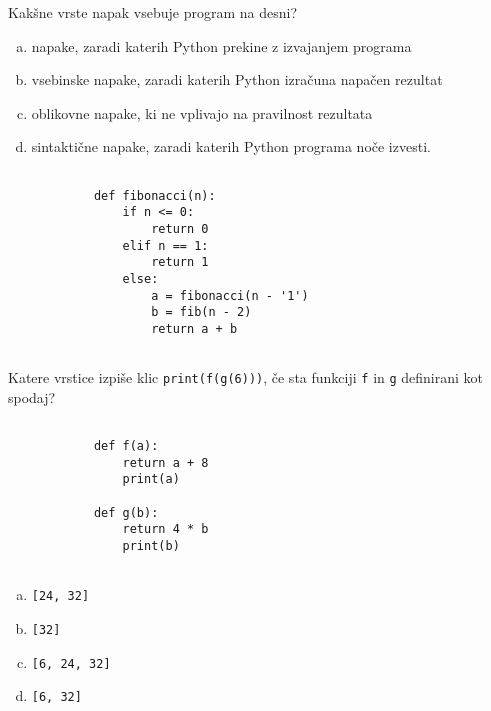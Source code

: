 \documentclass[arhiv, 10pt]{../izpit}
\newcommand{\inlinepy}[1]{\texttt{#1}}
\begin{document}
        \naloga*
        \begin{multicols}{2}
        \noindent
        Kakšne vrste napak vsebuje program na desni?

        \begin{enumerate}[(a)]
\item napake, zaradi katerih Python prekine z izvajanjem programa
\item vsebinske napake, zaradi katerih Python izračuna napačen rezultat
\item oblikovne napake, ki ne vplivajo na pravilnost rezultata
\item sintaktične napake, zaradi katerih Python programa noče izvesti.
\end{enumerate}

        \columnbreak

        \begin{verbatim}
        
            def fibonacci(n):
                if n <= 0:
                    return 0
                elif n == 1:
                    return 1
                else:
                    a = fibonacci(n - '1')
                    b = fib(n - 2)
                    return a + b
            
        \end{verbatim}

        \end{multicols}

    
        \naloga*
        Katere vrstice izpiše klic \inlinepy{print(f(g(6)))}, če sta funkciji \inlinepy{f} in \inlinepy{g} definirani kot spodaj?

        \begin{multicols}{2}
        \begin{verbatim}
        
            def f(a):
                return a + 8
                print(a)

            def g(b):
                return 4 * b
                print(b)
        
        \end{verbatim}

        \begin{enumerate}[(a)]
\item \inlinepy{[24, 32]}
\item \inlinepy{[32]}
\item \inlinepy{[6, 24, 32]}
\item \inlinepy{[6, 32]}
\end{enumerate}

        \end{multicols}
    
\end{document}
